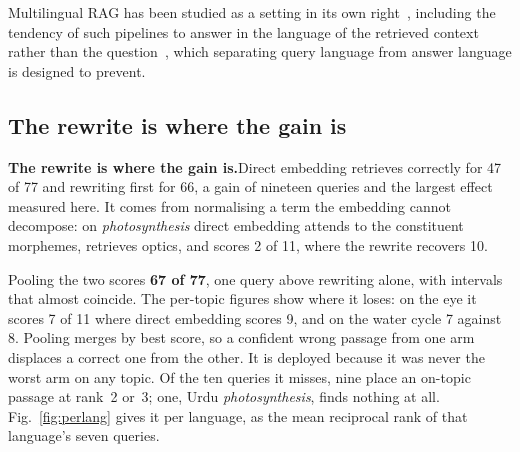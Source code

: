 Multilingual RAG has been studied as a setting in its own right~\cite{b9}, including the tendency of such pipelines to answer in the language of the retrieved context rather than the question~\cite{b10}, which separating query language from answer language is designed to prevent. \ifspringer\subsection{The rewrite is where the gain is}\else\textbf{The rewrite is where the gain is.}\fi Direct embedding retrieves correctly for 47 of 77 and rewriting first for 66, a gain of nineteen queries and the largest effect measured here. It comes from normalising a term the embedding cannot decompose: on \emph{photosynthesis} direct embedding attends to the constituent morphemes, retrieves optics, and scores 2 of 11, where the rewrite recovers 10.

Pooling the two scores \textbf{67 of 77}, one query above rewriting alone, with intervals that almost coincide. The per-topic figures show where it loses: on the eye it scores 7 of 11 where direct embedding scores 9, and on the water cycle 7 against 8. Pooling merges by best score, so a confident wrong passage from one arm displaces a correct one from the other. It is deployed because it was never the worst arm on any topic. Of the ten queries it misses, nine place an on-topic passage at rank~2 or~3; one, Urdu \emph{photosynthesis}, finds nothing at all. Fig.~\ref{fig:perlang} gives it per language, as the mean reciprocal rank of that language's seven queries.

